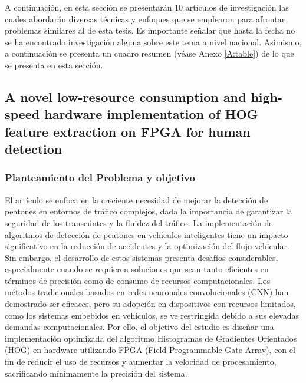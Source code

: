 A continuación, en esta sección se presentarán 10 artículos de investigación las cuales abordarán diversas técnicas y enfoques que se emplearon para afrontar problemas similares al de esta tesis. Es importante señalar que hasta la fecha
 no se ha encontrado investigación alguna sobre este tema a nivel nacional. Asimismo, a continuación se presenta un cuadro resumen (véase Anexo \ref{A:table}) de lo que se presenta en esta sección.



\subsection{A novel low-resource consumption and high-speed hardware implementation of HOG feature extraction on FPGA for human detection }


\subsubsection{Planteamiento del Problema y objetivo }
El artículo se enfoca en la creciente necesidad de mejorar la detección de peatones en entornos de tráfico complejos, dada la importancia de garantizar la seguridad de los transeúntes y la fluidez del tráfico. La implementación de algoritmos de detección de peatones en vehículos inteligentes tiene un impacto significativo en la reducción de accidentes y la optimización del flujo vehicular. Sin embargo, el desarrollo de estos sistemas presenta desafíos considerables, especialmente cuando se requieren soluciones que sean tanto eficientes en términos de precisión como de consumo de recursos computacionales. Los métodos tradicionales basados en redes neuronales convolucionales (CNN) han demostrado ser eficaces, pero su adopción en dispositivos con recursos limitados, como los sistemas embebidos en vehículos, se ve restringida debido a sus elevadas demandas computacionales. Por ello, el objetivo del estudio es diseñar una implementación optimizada del algoritmo Histogramas de Gradientes Orientados (HOG) en hardware utilizando FPGA (Field Programmable Gate Array), con el fin de reducir el uso de recursos y aumentar la velocidad de procesamiento, sacrificando mínimamente la precisión del sistema.

